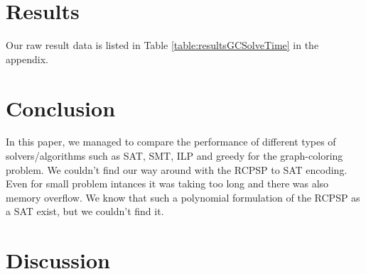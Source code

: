 \documentclass{sig-alternate}
\begin{document}
\section{Results}

Our raw result data is listed in Table \ref{table:resultsGCSolveTime} in the appendix. 

\section{Conclusion}
In this paper, we managed to compare the performance of different types of solvers/algorithms such as SAT, SMT, ILP and greedy for the graph-coloring problem.
We couldn't find our way around with the RCPSP to SAT encoding. Even for small problem intances it was taking too long and there was also memory overflow. We know that such a polynomial formulation of the RCPSP as a SAT exist, but we couldn't find it.
\section{Discussion}
\end{document}
